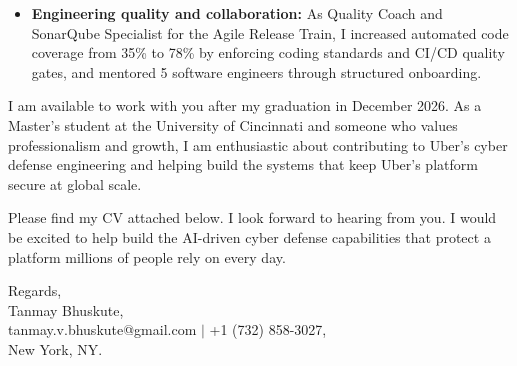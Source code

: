 \documentclass[11pt]{letter}
\begin{document}
\begin{letter}{}
\begin{itemize}[leftmargin=*, itemsep=0.45em]
    \item \textbf{Engineering quality and collaboration:} As Quality Coach and SonarQube Specialist for the Agile Release Train, I increased automated code coverage from 35\% to 78\% by enforcing coding standards and CI/CD quality gates, and mentored 5 software engineers through structured onboarding.
\end{itemize}

I am available to work with you after my graduation in December 2026. As a Master's student at the University of Cincinnati and someone who values professionalism and growth, I am enthusiastic about contributing to Uber's cyber defense engineering and helping build the systems that keep Uber's platform secure at global scale.

Please find my CV attached below. I look forward to hearing from you. I would be excited to help build the AI-driven cyber defense capabilities that protect a platform millions of people rely on every day.

{\setlength{\parskip}{0pt}
Regards,\\
Tanmay Bhuskute,\\
tanmay.v.bhuskute@gmail.com $\mid$ +1 (732) 858-3027,\\
New York, NY.
}

\end{letter}
\end{document}
